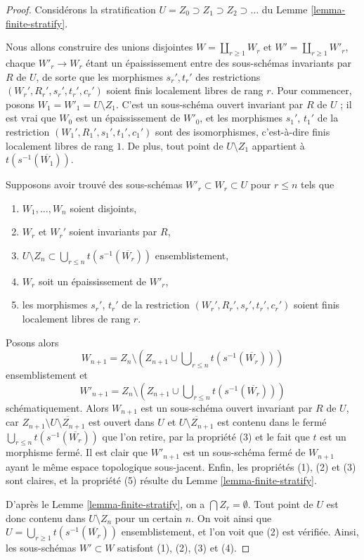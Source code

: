 \begin{proof}
Considérons la stratification $U = Z_0 \supset Z_1 \supset Z_2 \supset \ldots$
du Lemme \ref{lemma-finite-stratify}.

\medskip\noindent
Nous allons construire des unions disjointes $W = \coprod_{r \geq 1} W_r$ et
$W' = \coprod_{r \geq 1} W'_r$, chaque $W'_r \to W_r$ étant un épaississement
entre des sous-schémas invariants par $R$ de $U$, de sorte que les morphismes
$s_r', t_r'$ des restrictions $(W_r', R_r', s_r', t_r', c_r')$
soient finis localement libres de rang $r$. Pour commencer, posons
$W_1 = W'_1 = U \setminus Z_1$. C'est un sous-schéma ouvert invariant par $R$
de $U$ ; il est vrai que $W_0$ est un épaississement de $W'_0$,
et les morphismes $s_1'$, $t_1'$ de la
restriction $(W_1', R_1', s_1', t_1', c_1')$ sont des isomorphismes, c'est-à-dire
finis localement libres de rang $1$.
De plus, tout point de $U \setminus Z_1$ appartient à $t(s^{-1}(\overline{W_1}))$.

\medskip\noindent
Supposons avoir trouvé des sous-schémas $W'_r \subset W_r \subset U$ pour $r \leq n$
tels que
\begin{enumerate}
\item $W_1, \ldots, W_n$ soient disjoints,
\item $W_r$ et $W_r'$ soient invariants par $R$,
\item $U \setminus Z_n \subset \bigcup_{r \leq n} t(s^{-1}(\overline{W_r}))$
ensemblistement,
\item $W_r$ soit un épaississement de $W'_r$,
\item les morphismes $s_r'$, $t_r'$ de la restriction
$(W_r', R_r', s_r', t_r', c_r')$ soient finis localement libres de rang $r$.
\end{enumerate}
Posons alors
$$
W_{n + 1} = Z_n \setminus
\left(
Z_{n + 1} \cup \bigcup\nolimits_{r \leq n} t(s^{-1}(\overline{W_r}))
\right)
$$
ensemblistement et
$$
W'_{n + 1} = Z_n \setminus
\left(
Z_{n + 1} \cup \bigcup\nolimits_{r \leq n} t(s^{-1}(\overline{W_r}))
\right)
$$
schématiquement. Alors $W_{n + 1}$ est un sous-schéma ouvert invariant par $R$
de $U$, car $Z_{n + 1} \setminus \overline{U \setminus Z_{n + 1}}$
est ouvert dans $U$ et $\overline{U \setminus Z_{n + 1}}$ est contenu
dans le fermé $\bigcup\nolimits_{r \leq n} t(s^{-1}(\overline{W_r}))$
que l'on retire, par la propriété (3) et le fait que $t$ est un morphisme fermé.
Il est clair que $W'_{n + 1}$ est un sous-schéma fermé
de $W_{n + 1}$ ayant le même espace topologique sous-jacent.
Enfin, les propriétés (1), (2) et (3) sont claires, et la propriété (5) résulte du
Lemme \ref{lemma-finite-stratify}.

\medskip\noindent
D'après le Lemme \ref{lemma-finite-stratify}, on a $\bigcap Z_r = \emptyset$.
Tout point de $U$ est donc contenu dans $U \setminus Z_n$
pour un certain $n$. On voit ainsi que
$U = \bigcup_{r \geq 1} t(s^{-1}(\overline{W_r}))$
ensemblistement, et l'on voit que (2) est vérifiée.
Ainsi, les sous-schémas $W' \subset W$ satisfont (1), (2), (3) et (4).
\end{proof}

